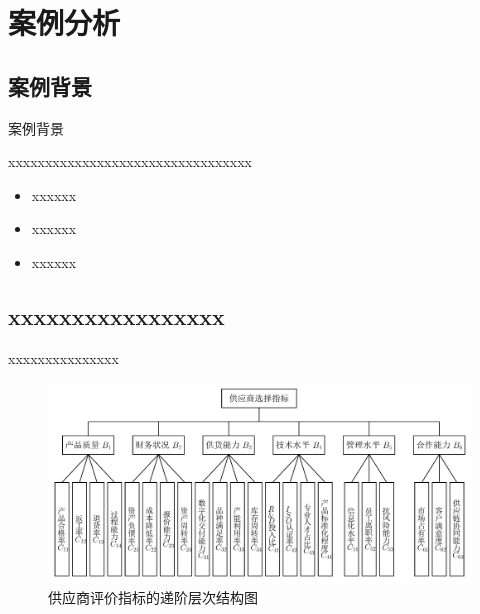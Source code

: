 \documentclass{beamer}
\begin{document}
\section{案例分析}
\subsection{案例背景}
\begin{frame}{案例背景}

\qquad xxxxxxxxxxxxxxxxxxxxxxxxxxxxxxxxx
\vspace{5mm}
\begin{itemize}
	\item xxxxxx
	\item xxxxxx
	\item xxxxxx
\end{itemize}

\end{frame}

\subsection{xxxxxxxxxxxxxxxxx}
	\begin{frame}{xxxxxxxxxxxxxxx}
		\vspace{-7mm}
		\begin{figure}[h]
	\centering
	\includegraphics[height=0.65\textheight,trim=10 0 0 0,clip]{pic/递进层次结构示意图_2.pdf}
	\caption{供应商评价指标的递阶层次结构图}
	\label{递进层次结构示意图_2}
\end{figure}
	\end{frame}
\end{document}
